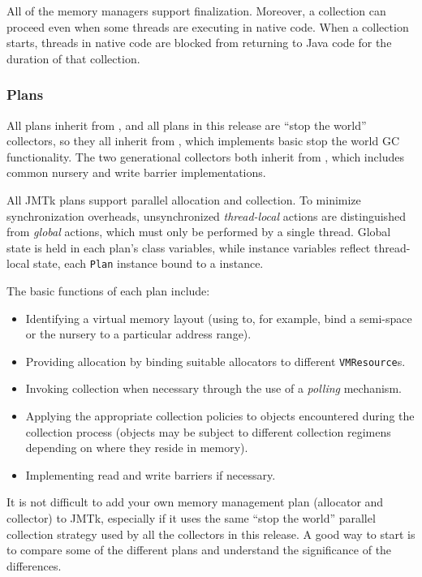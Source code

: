 All of the memory managers support finalization.  Moreover, a
collection can proceed even when some threads are executing in native
code. When a collection starts, threads in native code are blocked
from returning to Java code for the duration of that collection.

\subsubsection{Plans} \label{sssec:plans}

All plans inherit from ,
and all plans in this release are ``stop the world'' collectors, so
they all inherit from
, which implements
basic stop the world GC functionality.  The two generational
collectors both inherit from
, which includes
common nursery and write barrier implementations.

All JMTk plans support parallel allocation and collection.  To
minimize synchronization overheads, unsynchronized \emph{thread-local}
actions are distinguished from \emph{global} actions, which must only
be performed by a single thread.  Global state is held in each plan's
class variables, while instance variables reflect thread-local state,
each \texttt{Plan} instance bound to a
 instance.

The basic functions of each plan include:
\begin{itemize}
\item Identifying a virtual memory layout (using
   to, for example, bind
  a semi-space or the nursery to a particular address range).
\item Providing allocation by binding suitable allocators to different
  \texttt{VMResource}s.
\item Invoking collection when necessary through the use of a
  \emph{polling} mechanism.
\item Applying the appropriate collection policies to objects
  encountered during the collection process (objects may be subject to
  different collection regimens depending on where they reside in
  memory).
\item Implementing read and write barriers if necessary.
\end{itemize}

It is not difficult to add your own memory management plan (allocator
and collector) to JMTk, especially if it uses the same ``stop the
world'' parallel collection strategy used by all the collectors in
this release.  A good way to start is to compare some of the different
plans and understand the significance of the differences.

